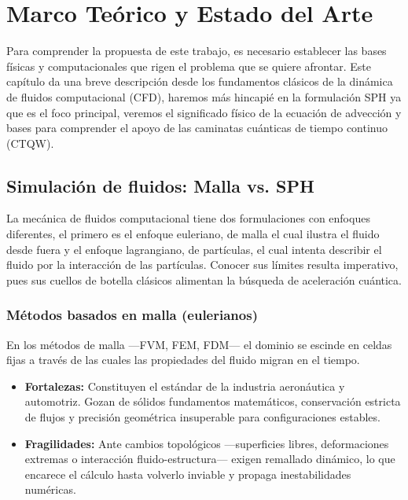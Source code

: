 
\chapter{Marco Teórico y Estado del Arte}
\label{ch:marco_teorico}

Para comprender la propuesta de este trabajo, es necesario establecer las bases físicas y computacionales que rigen el problema que se quiere afrontar. Este capítulo da una breve descripción desde los fundamentos clásicos de la dinámica de fluidos computacional (CFD), haremos más hincapié en la formulación SPH ya que es el foco principal, veremos el significado físico de la ecuación de advección y bases para comprender el apoyo de las caminatas cuánticas de tiempo continuo (CTQW).

\section{Simulación de fluidos: Malla vs. SPH}

La mecánica de fluidos computacional tiene dos formulaciones con enfoques diferentes, el primero es el enfoque euleriano, de malla el cual ilustra el fluido desde fuera y el enfoque lagrangiano, de partículas, el cual intenta describir el fluido por la interacción de las partículas. Conocer sus límites resulta imperativo, pues sus cuellos de botella clásicos alimentan la búsqueda de aceleración cuántica.

\subsection*{Métodos basados en malla (eulerianos)}
En los métodos de malla —FVM, FEM, FDM— el dominio se escinde en celdas fijas a través de las cuales las propiedades del fluido migran en el tiempo.

\begin{itemize}
    \item \textbf{Fortalezas:} Constituyen el estándar de la industria aeronáutica y automotriz. Gozan de sólidos fundamentos matemáticos, conservación estricta de flujos y precisión geométrica insuperable para configuraciones estables.
    \item \textbf{Fragilidades:} Ante cambios topológicos —superficies libres, deformaciones extremas o interacción fluido-estructura— exigen remallado dinámico, lo que encarece el cálculo hasta volverlo inviable y propaga inestabilidades numéricas.
\end{itemize}

